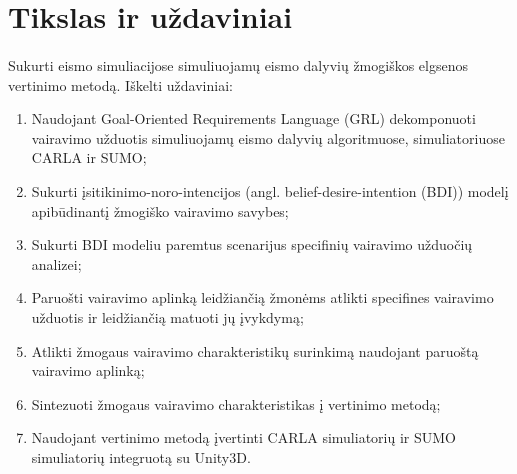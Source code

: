 \documentclass{beamer}
\begin{document}
\section{Tikslas ir uždaviniai}
\begingroup
\small%
\begin{frame}{\insertsection}
	\framesubtitle{\insertsubsection}
	\vspace{-30.5pt}
	
	Sukurti eismo simuliacijose simuliuojamų eismo dalyvių žmogiškos elgsenos vertinimo metodą. Iškelti uždaviniai:
	
	\begin{enumerate}
		\item Naudojant Goal-Oriented Requirements Language (GRL) dekomponuoti vairavimo užduotis simuliuojamų eismo dalyvių algoritmuose, simuliatoriuose CARLA ir SUMO;
		\item Sukurti įsitikinimo-noro-intencijos (angl. belief-desire-intention (BDI)) modelį apibūdinantį žmogiško vairavimo savybes;
		\item Sukurti BDI modeliu paremtus scenarijus specifinių vairavimo užduočių analizei;
		\item Paruošti vairavimo aplinką leidžiančią žmonėms atlikti specifines vairavimo užduotis ir leidžiančią matuoti jų įvykdymą;
		\item Atlikti žmogaus vairavimo charakteristikų surinkimą naudojant paruoštą vairavimo aplinką;
		\item Sintezuoti žmogaus vairavimo charakteristikas į vertinimo metodą;
		\item Naudojant vertinimo metodą įvertinti CARLA simuliatorių ir SUMO simuliatorių integruotą su Unity3D.
	\end{enumerate}
\end{frame}
\endgroup
\end{document}
